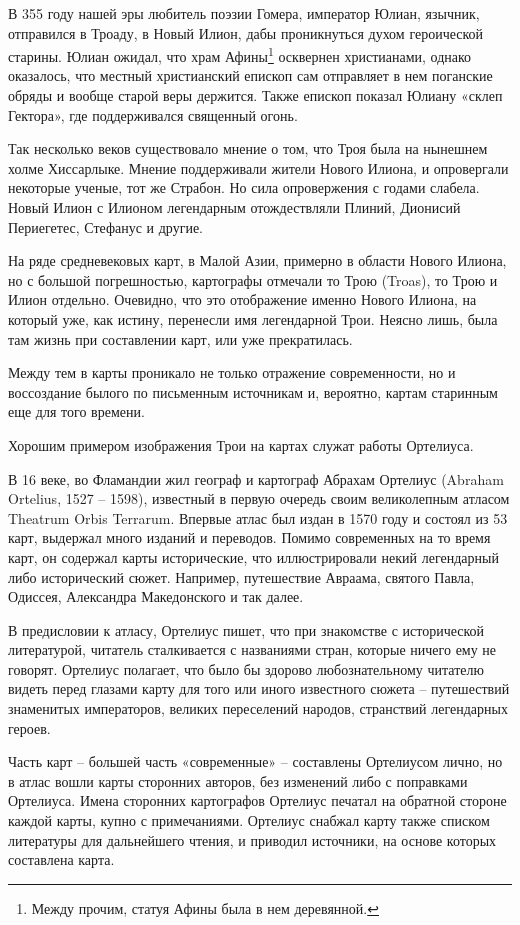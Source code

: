 В 355 году нашей эры любитель поэзии Гомера, император Юлиан, язычник, отправился в Троаду, в Новый Илион, дабы проникнуться духом героической старины. Юлиан ожидал, что храм Афины\footnote{Между прочим, статуя Афины была в нем деревянной.} осквернен христианами, однако оказалось, что местный христианский епископ сам отправляет в нем поганские обряды и вообще старой веры держится. Также епископ показал Юлиану «склеп Гектора», где поддерживался священный огонь.

Так несколько веков существовало мнение о том, что Троя была на нынешнем холме Хиссарлыке. Мнение поддерживали жители Нового Илиона, и опровергали некоторые ученые, тот же Страбон. Но сила опровержения с годами слабела. Новый Илион с Илионом легендарным отождествляли Плиний, Дионисий Периегетес, Стефанус и другие. 

На ряде средневековых карт, в Малой Азии, примерно в области Нового Илиона, но с большой погрешностью, картографы отмечали то Трою (Troas), то Трою и Илион отдельно. Очевидно, что это отображение именно Нового Илиона, на который уже, как истину, перенесли имя легендарной Трои. Неясно лишь, была там жизнь при составлении карт, или уже прекратилась.

Между тем в карты проникало не только отражение современности, но и воссоздание былого по письменным источникам и, вероятно, картам старинным еще для того времени.

Хорошим примером изображения Трои на картах служат работы Ортелиуса.

В 16 веке, во Фламандии жил географ и картограф Абрахам Ортелиус (Abraham Ortelius, 1527 – 1598), известный в первую очередь своим великолепным атласом Theatrum Orbis Terrarum. Впервые атлас был издан в 1570 году и состоял из 53 карт, выдержал много изданий и переводов. Помимо современных на то время карт, он содержал карты исторические, что иллюстрировали некий легендарный либо исторический сюжет. Например, путешествие Авраама, святого Павла, Одиссея, Александра Македонского и так далее. 

В предисловии к атласу, Ортелиус пишет, что при знакомстве с исторической литературой, читатель сталкивается с названиями стран, которые ничего ему не говорят. Ортелиус полагает, что было бы здорово любознательному читателю видеть перед глазами карту для того или иного известного сюжета – путешествий знаменитых императоров, великих переселений народов, странствий легендарных героев.

Часть карт – большей часть «современные» – составлены Ортелиусом лично, но в атлас вошли карты сторонних авторов, без изменений либо с поправками Ортелиуса. Имена сторонних картографов Ортелиус печатал на обратной стороне каждой карты, купно с примечаниями. Ортелиус снабжал карту также списком литературы для дальнейшего чтения, и приводил источники, на основе которых составлена карта. 

